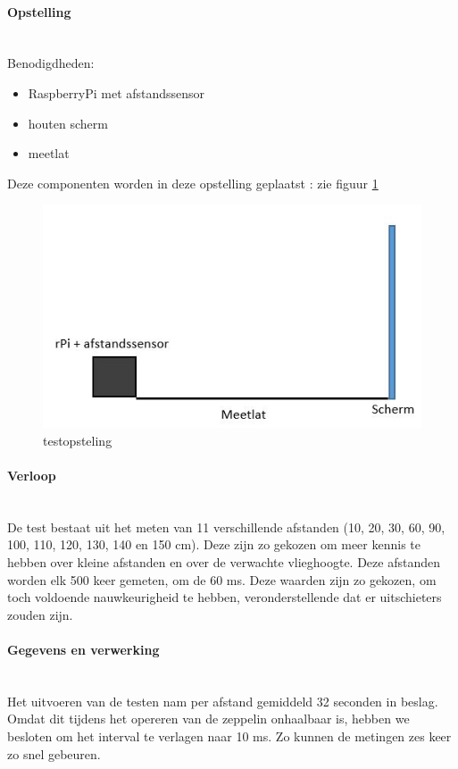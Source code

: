 \documentclass[tt]{penoverslag}
\begin{document}
\paragraph{Opstelling} ~\\ 
Benodigdheden:
\begin{itemize}
	\item RaspberryPi met afstandssensor
	\item houten scherm
	\item meetlat
\end{itemize}
Deze componenten worden in deze opstelling geplaatst : zie figuur \ref{opstelling}
\begin{figure}[ht!]%
\centering
\includegraphics[scale=0.6]{opstelling.jpg}%
\caption{testopsteling}%
\label{opstelling}%
\end{figure}

\paragraph{Verloop} ~\\ 
De test bestaat uit het meten van 11 verschillende afstanden (10, 20, 30, 60, 90, 100, 110, 120, 130, 140 en 150 cm). Deze zijn zo gekozen om meer kennis te hebben over kleine afstanden en over de verwachte vlieghoogte. Deze afstanden worden elk 500 keer gemeten, om de 60 ms. Deze waarden zijn zo gekozen, om toch voldoende nauwkeurigheid te hebben, veronderstellende dat er uitschieters zouden zijn. 

\paragraph{Gegevens en verwerking} ~\\ 
Het uitvoeren van de testen nam per afstand gemiddeld 32 seconden in beslag. Omdat dit tijdens het opereren van de zeppelin onhaalbaar is, hebben we besloten om het interval te verlagen naar 10 ms. Zo kunnen de metingen zes keer zo snel gebeuren. 
\end{document}
